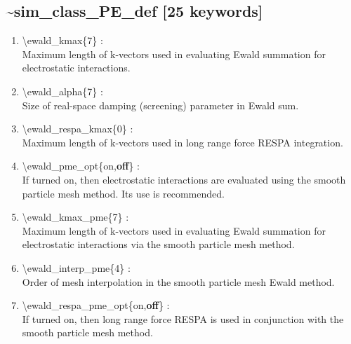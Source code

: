 \documentclass[12pt,titlepage]{article}
\begin{document}
\newpage
\subsection*{\bf \~{}sim\_class\_PE\_def [25 keywords]}

\begin{enumerate}

 \vspace{0.15in} 
 \item   \textbackslash{}ewald\_kmax\{7\} : \\
  Maximum length of k-vectors used in evaluating Ewald summation for 
  electrostatic interactions.

 \vspace{0.15in} 
 \item   \textbackslash{}ewald\_alpha\{7\} : \\
  Size of real-space damping (screening) parameter in Ewald sum.

 \vspace{0.15in} 
 \item   \textbackslash{}ewald\_respa\_kmax\{0\} : \\
   Maximum length of k-vectors used in long range force RESPA integration.

 \vspace{0.15in}
 \item   \textbackslash{}ewald\_pme\_opt\{on,{\bf off}\} : \\
  If turned on, then electrostatic interactions are evaluated using the
  smooth particle mesh method.  Its use is recommended.

 \vspace{0.15in} 
 \item   \textbackslash{}ewald\_kmax\_pme\{7\} : \\
  Maximum length of k-vectors used in evaluating Ewald summation for 
  electrostatic interactions via the smooth particle mesh method.

 \vspace{0.15in} 
 \item   \textbackslash{}ewald\_interp\_pme\{4\} : \\
   Order of mesh interpolation in the smooth particle mesh Ewald method.

 \vspace{0.15in} 
 \item   \textbackslash{}ewald\_respa\_pme\_opt\{on,{\bf off}\} : \\
  If turned on, then long range force RESPA is used in conjunction with the
  smooth particle mesh method.


\end{enumerate}
\end{document}
